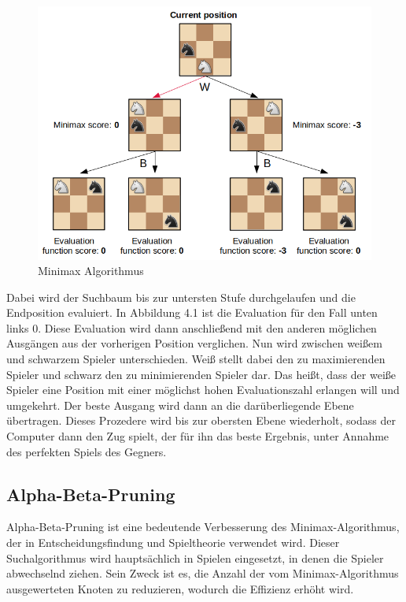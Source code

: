 \begin{figure}[ht]
    \centering
    \includegraphics[scale=0.3]{images/chess_minimax_position.png}
    \caption{Minimax Algorithmus}
\end{figure}

Dabei wird der Suchbaum bis zur untersten Stufe durchgelaufen und die Endposition evaluiert. In Abbildung 4.1 ist die Evaluation für den Fall unten links
0. Diese Evaluation wird dann anschließend mit den anderen möglichen Ausgängen aus der vorherigen Position verglichen. Nun wird zwischen weißem und schwarzem 
Spieler unterschieden. Weiß stellt dabei den zu maximierenden Spieler und schwarz den zu minimierenden Spieler dar. Das heißt, dass 
der weiße Spieler eine Position mit einer möglichst hohen Evaluationszahl erlangen will und umgekehrt. Der beste Ausgang wird dann an die darüberliegende Ebene 
übertragen. Dieses Prozedere wird bis zur obersten Ebene wiederholt, sodass der Computer dann den Zug spielt, der für ihn das beste Ergebnis, unter 
Annahme des perfekten Spiels des Gegners.~\cite{Diderich2001}

\subsection{Alpha-Beta-Pruning}
Alpha-Beta-Pruning ist eine bedeutende Verbesserung des Minimax-Algorithmus, der in Entscheidungsfindung und Spieltheorie verwendet wird. 
Dieser Suchalgorithmus wird hauptsächlich in Spielen eingesetzt, in denen die Spieler abwechselnd ziehen. 
Sein Zweck ist es, die Anzahl der vom Minimax-Algorithmus ausgewerteten Knoten zu reduzieren, wodurch die Effizienz erhöht wird.

